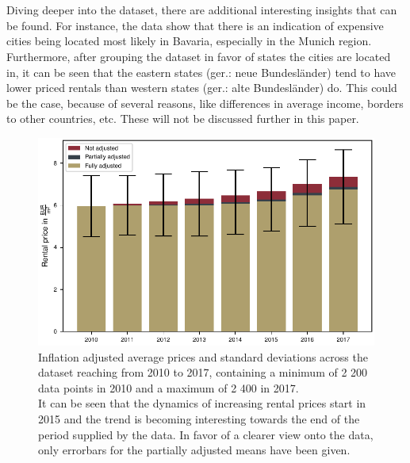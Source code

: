 \documentclass{article}
\begin{document}
	\\\\
	Diving deeper into the dataset, there are additional interesting insights that can be found. For instance, the data show that there is an indication of expensive cities being located most likely in Bavaria, especially in the Munich region. Furthermore, after grouping the dataset in favor of states the cities are located in, it can be seen that the eastern states (ger.: neue Bundesländer) tend to have lower priced rentals than western states (ger.: alte Bundesländer) do. This could be the case, because of several reasons, like differences in average income, borders to other countries, etc. These will not be discussed further in this paper.
		\begin{figure}[htp]
			\centering
			\includegraphics[width=0.7\linewidth]{../fig/figures/barchart_rental_prices.pdf}
			\caption{Inflation adjusted average prices and standard deviations across the dataset reaching from 2010 to 2017, containing a minimum of 2 200 data points in 2010 and a maximum of 2 400 in 2017.\\It can be seen that the dynamics of increasing rental prices start in 2015 and the trend is becoming interesting towards the end of the period supplied by the data. In favor of a clearer view onto the data, only errorbars for the partially adjusted means have been given.}
			\label{barchart_rental_prices}
		\end{figure}
	
\end{document}
